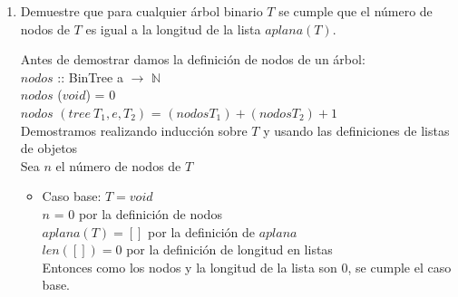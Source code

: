 \documentclass{article}
\begin{document}
\begin{enumerate}
{\begin{enumerate}
{		            Usando la definición de lista de objetos que está en las notas, podemos definir $aplana$ como:\\
                    
                    $aplana$ :: BinTree a $\rightarrow$ [a]\\
					$aplana$ ($void$) = []\\
					$aplana$ $(tree \ T_1, e, T_2)$ = $(aplana t1) ++ (e:(aplana t2))$\\
                }
                \item {
                    Demuestre que para cualquier árbol binario $T$ se cumple que
                    el número de nodos de $T$ es igual a la longitud de la lista 
                    $aplana(T)$.
                    
                    Antes de demostrar damos la definición de nodos de un árbol:\\
                    $nodos$ :: BinTree a $\rightarrow$ $\mathbb{N}$\\
					$nodos$ ($void$) = 0\\
					$nodos$ $(tree \ T_1, e, T_2)$ = $(nodos T_1) + (nodos T_2) + 1$\\
                    
                    
                    Demostramos realizando inducción sobre $T$ y usando las definiciones de listas de objetos \\
                    Sea $n$ el número de nodos de $T$
                    \begin{itemize}                    
                    \item {
                        Caso base: $T = void$\\
                        $n$ = 0 por la definición de nodos\\
                        $aplana(T) = []$ por la definición de $aplana$ \\
                        $len([]) = 0$ por la definición de longitud en listas\\ Entonces como los nodos y la longitud de la lista son 0, se cumple el caso base.
                        
}
\end{itemize}}
\end{enumerate}}
\end{enumerate}
\end{document}
